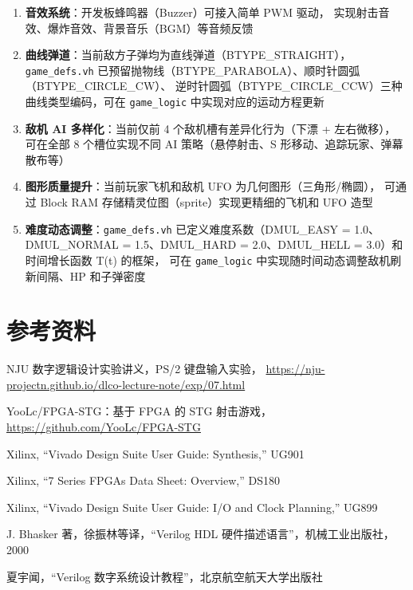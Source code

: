 \documentclass[12pt,a4paper]{ctexart}
\begin{document}
\begin{enumerate}[label=(\arabic*)]
    \item \textbf{音效系统}：开发板蜂鸣器（Buzzer）可接入简单 PWM 驱动，
    实现射击音效、爆炸音效、背景音乐（BGM）等音频反馈
    \item \textbf{曲线弹道}：当前敌方子弹均为直线弹道（BTYPE\_STRAIGHT），
    \texttt{game\_defs.vh} 已预留抛物线（BTYPE\_PARABOLA）、顺时针圆弧（BTYPE\_CIRCLE\_CW）、
    逆时针圆弧（BTYPE\_CIRCLE\_CCW）三种曲线类型编码，可在 \texttt{game\_logic} 中实现对应的运动方程更新
    \item \textbf{敌机 AI 多样化}：当前仅前 4 个敌机槽有差异化行为（下漂 + 左右微移），
    可在全部 8 个槽位实现不同 AI 策略（悬停射击、S 形移动、追踪玩家、弹幕散布等）
    \item \textbf{图形质量提升}：当前玩家飞机和敌机 UFO 为几何图形（三角形/椭圆），
    可通过 Block RAM 存储精灵位图（sprite）实现更精细的飞机和 UFO 造型
    \item \textbf{难度动态调整}：\texttt{game\_defs.vh} 已定义难度系数（DMUL\_EASY = 1.0、
    DMUL\_NORMAL = 1.5、DMUL\_HARD = 2.0、DMUL\_HELL = 3.0）和时间增长函数 T(t) 的框架，
    可在 \texttt{game\_logic} 中实现随时间动态调整敌机刷新间隔、HP 和子弹密度
\end{enumerate}


\section{参考资料}

\begin{enumerate}[label={[\arabic*]}]
    \item NJU 数字逻辑设计实验讲义，PS/2 键盘输入实验，
          \url{https://nju-projectn.github.io/dlco-lecture-note/exp/07.html}
    \item YooLc/FPGA-STG：基于 FPGA 的 STG 射击游戏，
          \url{https://github.com/YooLc/FPGA-STG}
    \item Xilinx, ``Vivado Design Suite User Guide: Synthesis,'' UG901
    \item Xilinx, ``7 Series FPGAs Data Sheet: Overview,'' DS180
    \item Xilinx, ``Vivado Design Suite User Guide: I/O and Clock Planning,'' UG899
    \item J. Bhasker 著，徐振林等译，``Verilog HDL 硬件描述语言''，机械工业出版社，2000
    \item 夏宇闻，``Verilog 数字系统设计教程''，北京航空航天大学出版社
\end{enumerate}
\end{document}
